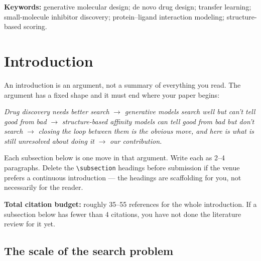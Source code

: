 \documentclass[11pt]{article}
\begin{document}
\noindent\textbf{Keywords:} generative molecular design; de novo drug design;
transfer learning; small-molecule inhibitor discovery; protein--ligand
interaction modeling; structure-based scoring.

\section{Introduction}
\label{sec:intro}

\begin{guide}
An introduction is an argument, not a summary of everything you read. The
argument has a fixed shape and it must end where your paper begins:

\smallskip
\emph{Drug discovery needs better search} $\rightarrow$ \emph{generative models
search well but can't tell good from bad} $\rightarrow$ \emph{structure-based
affinity models can tell good from bad but don't search} $\rightarrow$
\emph{closing the loop between them is the obvious move, and here is what is
still unresolved about doing it} $\rightarrow$ \emph{our contribution.}

\smallskip
Each subsection below is one move in that argument. Write each as
2--4 paragraphs. Delete the \texttt{\textbackslash subsection} headings before submission if
the venue prefers a continuous introduction --- the headings are scaffolding
for you, not necessarily for the reader.

\smallskip
\textbf{Total citation budget:} roughly 35--55 references for the whole
introduction. If a subsection below has fewer than 4 citations, you have not
done the literature review for it yet.
\end{guide}

\subsection{The scale of the search problem}
\label{sec:intro:problem}
\end{document}

